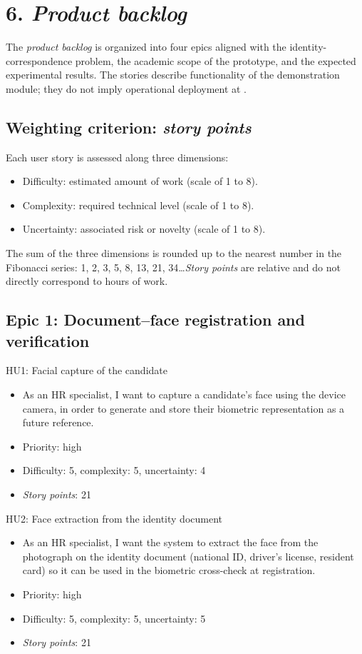 \documentclass[
  11pt, %
]{charter}
\begin{document}
\section{6. \textit{Product backlog}}
\label{sec:backlog}

The \textit{product backlog} is organized into four epics aligned with the identity-correspondence problem, the academic scope of the prototype, and the expected experimental results. The stories describe functionality of the demonstration module; they do not imply operational deployment at \empclientename.

\subsection{Weighting criterion: \textit{story points}}

Each user story is assessed along three dimensions:

\begin{itemize}
  \item Difficulty: estimated amount of work (scale of 1 to 8).
  \item Complexity: required technical level (scale of 1 to 8).
  \item Uncertainty: associated risk or novelty (scale of 1 to 8).
\end{itemize}

The sum of the three dimensions is rounded up to the nearest number in the Fibonacci series: 1, 2, 3, 5, 8, 13, 21, 34\dots \textit{Story points} are relative and do not directly correspond to hours of work.

\subsection{Epic 1: Document--face registration and verification}

HU1: Facial capture of the candidate
\begin{itemize}
  \item As an HR specialist, I want to capture a candidate's face using the device camera, in order to generate and store their biometric representation as a future reference.
  \item Priority: high
  \item Difficulty: 5, complexity: 5, uncertainty: 4
  \item \textit{Story points}: 21
\end{itemize}

HU2: Face extraction from the identity document
\begin{itemize}
  \item As an HR specialist, I want the system to extract the face from the photograph on the identity document (national ID, driver's license, resident card) so it can be used in the biometric cross-check at registration.
  \item Priority: high
  \item Difficulty: 5, complexity: 5, uncertainty: 5
  \item \textit{Story points}: 21
\end{itemize}
\end{document}
